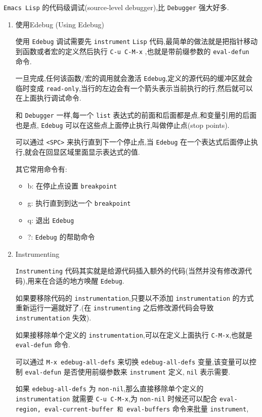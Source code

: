 \documentclass[11pt]{article}
\begin{document}
\texttt{Emacs Lisp} 的代码级调试(source-level debugger),比 \texttt{Debugger} 强大好多.

\begin{enumerate}
\item 使用Edebug (Using Edebug)
\label{sec:org903f455}

使用 \texttt{Edebug} 调试需要先 \texttt{instrument} \texttt{Lisp} 代码,最简单的做法就是把指针移动到函数或者宏的定义然后执行 \texttt{C-u C-M-x} ,也就是带前缀参数的 \texttt{eval-defun} 命令.

一旦完成,任何该函数/宏的调用就会激活 \texttt{Edebug},定义的源代码的缓冲区就会临时变成 \texttt{read-only},当行的左边会有一个箭头表示当前执行的行,然后就可以在上面执行调试命令.

和 \texttt{Debugger} 一样,每一个 \texttt{list} 表达式的前面和后面都是点,和变量引用的后面也是点, \texttt{Edebug} 可以在这些点上面停止执行,叫做停止点(stop points).

可以通过 \texttt{<SPC>} 来执行直到下一个停止点,当 \texttt{Edebug} 在一个表达式后面停止执行,就会在回显区域里面显示表达式的值.

其它常用命令有:

\begin{itemize}
\item b: 在停止点设置 \texttt{breakpoint}
\item g: 执行直到到达一个 \texttt{breakpoint}
\item q: 退出 \texttt{Edebug}
\item ?: \texttt{Edebug} 的帮助命令
\end{itemize}


\item Instrumenting
\label{sec:org58e569f}

\texttt{Instrumenting} 代码其实就是给源代码插入额外的代码(当然并没有修改源代码),用来在合适的地方唤醒 \texttt{Edebug}.

如果要移除代码的 \texttt{instrumentation},只要以不添加 \texttt{instrumentation} 的方式重新运行一遍就好了.(在 \texttt{instrumenting} 之后修改源代码会导致 \texttt{instrumentation} 失效).

如果接移除单个定义的 \texttt{instrumentation},可以在定义上面执行 \texttt{C-M-x},也就是 \texttt{eval-defun} 命令.

可以通过 \texttt{M-x edebug-all-defs} 来切换 \texttt{edebug-all-defs} 变量,该变量可以控制 \texttt{eval-defun} 是否使用前缀参数来 \texttt{instrument} 定义, \texttt{nil} 表示需要.

如果 \texttt{edebug-all-defs} 为 \texttt{non-nil},那么直接移除单个定义的 \texttt{instrumentation} 就需要 \texttt{C-u C-M-x},为 \texttt{non-nil} 时候还可以配合 \texttt{eval-region, eval-current-buffer 和 eval-buffers} 命令来批量 \texttt{instrument},


\end{enumerate}
\end{document}
